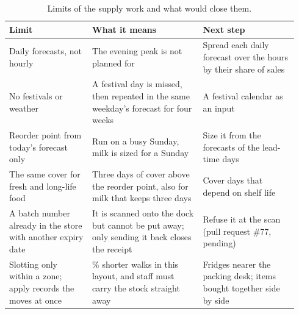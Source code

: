 \begin{table}[!htb]
  \centering
  \footnotesize
  \begin{tabular}{@{}>{\raggedright\arraybackslash}p{0.27\linewidth}>{\raggedright\arraybackslash}p{0.36\linewidth}
                  >{\raggedright\arraybackslash}p{0.31\linewidth}@{}}
    \toprule
    Limit & What it means & Next step \\
    \midrule
    Daily forecasts, not hourly & The evening peak is not planned for & Spread each daily forecast over the hours by
      their share of sales \\
    \addlinespace[3pt]
    No festivals or weather & A festival day is missed, then repeated in the same weekday's forecast for four weeks
      & A festival calendar as an input \\
    \addlinespace[3pt]
    Reorder point from today's forecast only & Run on a busy Sunday, milk is sized for a Sunday & Size it from the
      forecasts of the lead-time days \\
    \addlinespace[3pt]
    The same cover for fresh and long-life food & Three days of cover above the reorder point, also for milk that keeps
      three days & Cover days that depend on shelf life \\
    \addlinespace[3pt]
    A batch number already in the store with another expiry date & It is scanned onto the dock but cannot be put away;
      only sending it back closes the receipt & Refuse it at the scan (pull request \#77, pending) \\
    \addlinespace[3pt]
    Slotting only within a zone; apply records the moves at once & 1\% shorter walks in this layout, and staff must
      carry the stock straight away & Fridges nearer the packing desk; items bought together side by side \\
    \bottomrule
  \end{tabular}
  \caption{Limits of the supply work and what would close them.}
  \label{tab:m3-limits}
\end{table}
